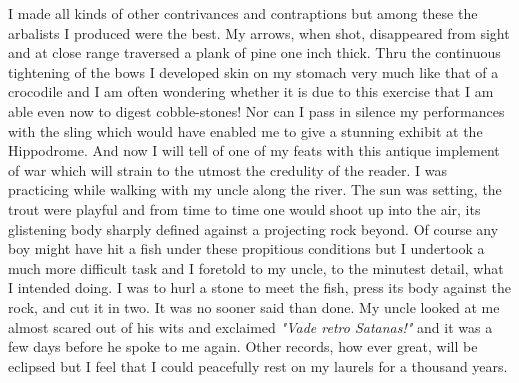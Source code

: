 \documentclass[a4paper,12pt,english,twoside,openright]{memoir}
\begin{document}
	I made all kinds of other contrivances and contraptions but among these the arbalists I produced 
	were the best.  My arrows, when shot, disappeared from sight and at close range traversed a 
	plank of pine one inch thick.  Thru the continuous tightening of the bows I developed skin on my 
	stomach very much like that of a crocodile and I am often wondering whether it is due to this 
	exercise that I am able even now to digest cobble-stones! Nor can I pass in silence my 
	performances with the sling which would have enabled me to give a stunning exhibit at the 
	Hippodrome.  And now I will tell of one of my feats with this antique implement of war which will 
	strain to the utmost the credulity of the reader.  I was practicing while walking with my uncle along 
	the river.  The sun was setting, the trout were playful and from time to time one would shoot up 
	into the air, its glistening body sharply defined against a projecting rock beyond.  Of course any 
	boy might have hit a fish under these propitious conditions but I undertook a much more difficult 
	task and I foretold to my uncle, to the minutest detail, what I intended doing.  I was to hurl a stone 
	to meet the fish, press its body against the rock, and cut it in two.  It was no sooner said than 
	done.  My uncle looked at me almost scared out of his wits and exclaimed \emph{"Vade retro Satanas!"} 
	and it was a few days before he spoke to me again.  Other records, how ever great, will be 
	eclipsed but I feel that I could peacefully rest on my laurels for a thousand years.
	


	{\centering
		\aldine\\
		\aldine\hspace{1.2em}\aldine
		\par}
	\vspace*{2cm}
	
\end{document}
